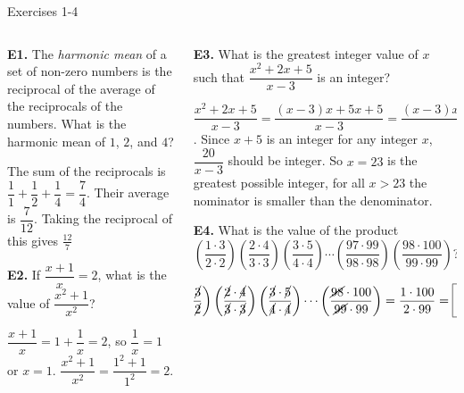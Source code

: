 \documentclass[9pt,aspectratio=169]{beamer}
\begin{document}
\begin{frame}{Exercises 1-4}
  \begin{columns}[T]
    \begin{column}{0.5\textwidth}
      \begin{problem}
        \textbf{E1.} The \emph{harmonic mean} of a set of non-zero numbers is the reciprocal of the average of the reciprocals of the numbers. What is the harmonic mean of $1$, $2$, and $4$?
      \end{problem}
      The sum of the reciprocals is $\dfrac{1}{1} + \dfrac{1}{2} + \dfrac{1}{4}= \dfrac{7}{4}$. Their average is $\dfrac{7}{12}$. Taking the reciprocal of this gives $\boxed{\frac{12}{7}}$
      \begin{problem}
        \textbf{E2.} If $\dfrac{x+1}{x} = 2$, what is the value of $\dfrac{x^2 + 1}{x^2}$?
      \end{problem}
      $\dfrac{x+1}{x} = 1 + \dfrac{1}{x} = 2$, so $\dfrac{1}{x} = 1$ or $x = 1$.
      $\dfrac{x^2 + 1}{x^2} = \dfrac{1^2 + 1}{1^2} = \boxed{2}$.
    \end{column}
    \begin{column}{0.5\textwidth}
      \begin{problem}
        \textbf{E3.}  What is the greatest integer value of $x$ such that $\dfrac{x^2 + 2x + 5}{x-3}$ is an integer?
      \end{problem}
      $\dfrac{x^2 + 2x + 5}{x-3} = \dfrac{(x-3)x +5x +5}{x-3}=\dfrac{(x-3)x + 5(x-3)+20}{x-3} = x + 5 + \dfrac{20}{x-3}$. Since $x+5$ is an integer for any integer $x$, $\dfrac{20}{x-3}$ should be integer. So $x = \boxed{23}$ is the greatest possible integer, for all $x>23$ the nominator is smaller than the denominator.
      \begin{problem}
        \textbf{E4.} What is the value of the product\[\left(\frac{1\cdot3}{2\cdot2}\right)\left(\frac{2\cdot4}{3\cdot3}\right)\left(\frac{3\cdot5}{4\cdot4}\right)\cdots\left(\frac{97\cdot99}{98\cdot98}\right)\left(\frac{98\cdot100}{99\cdot99}\right)?\] 
      \end{problem}
      \vspace*{-1em}
      \[\hspace*{-2em}\left(\frac{1\cdot\cancel{3}}{2\cdot\cancel{2}}\right)\left(\frac{\cancel{2}\cdot\cancel{4}}{\cancel{3}\cdot\cancel{3}}\right)\left(\frac{\cancel{3}\cdot\cancel{5}}{\cancel{4}\cdot\cancel{4}}\right)\cdots\left(\frac{\cancel{98}\cdot100}{\cancel{99}\cdot99}\right) = \frac{1\cdot 100}{2 \cdot 99}=\boxed{\frac{50}{99}}\] 
    \end{column}
  \end{columns}
\end{frame}
\end{document}
